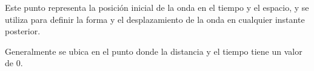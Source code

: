 Este punto representa la posición inicial de la onda en el tiempo y el espacio, y se utiliza para definir la forma y el desplazamiento de la onda en cualquier instante posterior.

Generalmente se ubica en el punto donde la distancia y el tiempo tiene un valor de $0$.

